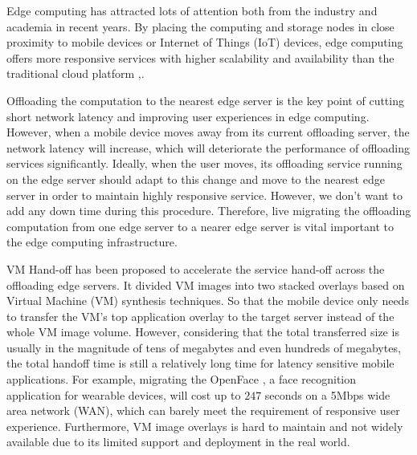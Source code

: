 


Edge computing has attracted lots of attention both from the industry and academia in recent years\cite{satya2009case,  MEC2014initiative, MEC2015-5G, yi2015fog,yi2015survey, satya2017edge}.
By placing the computing and storage nodes in close proximity to mobile devices or Internet of Things (IoT) devices, edge computing offers more responsive services with higher scalability and availability than the traditional cloud platform \cite{MEC2014initiative},\cite{satya2017edge}.

Offloading the computation to the nearest edge server is the key point of cutting short network latency and improving user experiences in edge computing. 
However, when a mobile device moves away from its current offloading server, the network latency will increase, which will deteriorate the performance of offloading services significantly. Ideally, when the user moves, its offloading service running on the edge server should adapt to this change and move to the nearest edge server in order to maintain highly responsive service. However, we don't want to add any down time during this procedure.
Therefore, live migrating the offloading computation from one edge server to a nearer edge server is vital important to the edge computing infrastructure. 

VM Hand-off \cite{ha2015vmhandoff} has been proposed to accelerate the service hand-off across the offloading edge servers. It divided VM images into two stacked overlays based on Virtual Machine (VM) synthesis \cite{satya2009case} techniques. %
So that the mobile device only needs to transfer the VM's top application overlay to the target server instead of the whole VM image volume. However, considering that the total transferred size is usually in the magnitude of tens of megabytes and even hundreds of megabytes, the total handoff time is still a relatively long time for latency sensitive mobile applications. For example, migrating the OpenFace \cite{openface2016}, a face recognition application for wearable devices, will cost up to $247$ seconds on a 5Mbps wide area network (WAN), which can barely meet the requirement of responsive user experience. 
Furthermore, VM image overlays is hard to maintain and not widely available due to its limited support and deployment in the real world.

